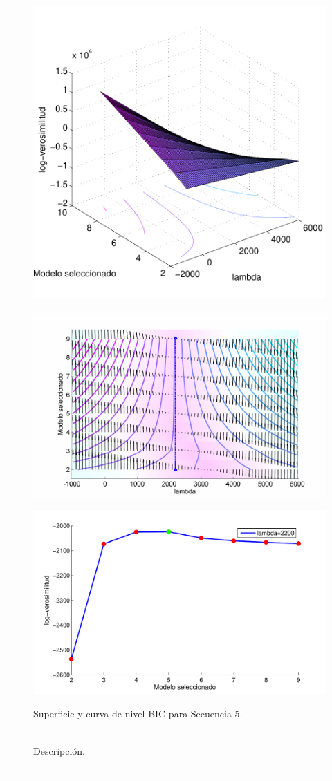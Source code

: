 \begin{figure}[H]
  \centerline  
  {\includegraphics[width=0.55\linewidth]{gfx/chap6/caldbic1} ~
   \includegraphics[width=0.5\linewidth]{gfx/chap6/caldbic2} }
  \centerline  
  {\includegraphics[width=0.4\linewidth]{gfx/chap6/caldbic3}
  } \quad
  \caption{Superficie y curva de nivel BIC para Secuencia 5.}
  \caption*{\\Descripción.}
  \label{fig:prb1_sup}
\end{figure}

-------------------------

